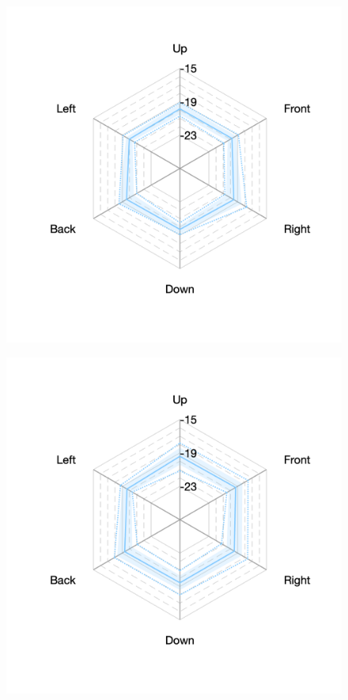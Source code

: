 \documentclass[11pt,a4j]{jreport}
\begin{document}
\begin{figure}[H]
  \begin{minipage}[b]{.33\textwidth}
    \hspace{1 \linewidth}
  \end{minipage}%
  \begin{minipage}[b]{.33\textwidth}
    \centering
    \includegraphics[width=1\linewidth]{images/realHallDirSt/late_S10_allhall.png}
    \label{fig:S10late}
  \end{minipage}%
  \begin{minipage}[b]{.33\textwidth}
    \centering
    \includegraphics[width=1\linewidth]{images/realHallDirSt/late_S09_allhall.png}
    \label{fig:S09late}
  \end{minipage}


\end{figure}
\end{document}
